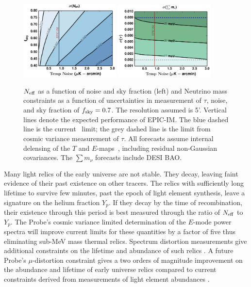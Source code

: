 \begin{figure}[t!]
\begin{center}
\includegraphics[width=0.45\textwidth]{figs/Neff.pdf}
\includegraphics[width=0.45\textwidth]{figs/Mnu_tauprior.pdf}
\caption{ \small \setlength{\baselineskip}{0.95\baselineskip}
${N_{\rm eff}}$ as a function of noise and sky fraction (left) and
Neutrino mass constraints as a function of uncertainties in measurement of $\tau$, noise, and 
sky fraction of $f_{\rm sky} = 0.7$. The resolution assumed is 5'.  
Vertical lines denote the expected performance of EPIC-IM. 
The blue dashed line is the current \planck~limit; the grey dashed line is the limit from cosmic variance 
measurement of $\tau$. All forecasts assume internal delensing of the $T$ and $E$-maps~\cite{Green:2016cjr}, 
including residual non-Gaussian covariances.  The $\sum m_\nu$ forecasts include DESI BAO.  
\label{fig:Neff_future} }
\end{center}
\vspace{-0.15in}
\end{figure}

Many light relics of the early universe are not stable. They decay, 
leaving faint evidence of their past existence on other tracers. The relics with sufficiently long lifetime to survive few minutes, 
past the epoch of light element synthesis, leave a signature on the helium fraction $Y_p$.  If they decay 
by the time of recombination, their existence through this period is best measured through the ratio of ${N_{\rm eff}}$ to $Y_p$. 
The Probe's cosmic variance limited determination 
of the $E$-mode power spectra will improve current limits for these quantities by
a factor of five thus eliminating sub-MeV mass thermal relics. 
%  
Spectrum distortion measurements give additional constraints on the lifetime and abundance 
of such relics \citep{Sarkar1984, Kawasaki1986, Hu1993b, Chluba2011therm}. A future Probe's $\mu$-distortion constraint gives a two orders of magnitude improvement on the abundance and lifetime of early universe relics \cite{Chluba2013fore, Chluba2013PCA} compared to current constraints derived from measurements of light element abundances \cite{Kawasaki2005, Jedamzik2006}.

